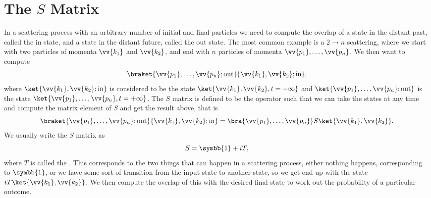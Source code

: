 \documentclass[fleqn]{NotesClass}
\newcommand{\ident}{\symbb{1}}
\begin{document}
    \section{The \texorpdfstring{\(S\)}{S} Matrix}
    In a scattering process with an arbitrary number of initial and final particles we need to compute the overlap of a state in the distant past, called the in state, and a state in the distant future, called the out state.
    The most common example is a \(2 \to n\) scattering, where we start with two particles of momenta \(\vv{k_1}\) and \(\vv{k_2}\), and end with \(n\) particles of momenta \(\vv{p_1}, \dotsc, \vv{p_n}\).
    We then want to compute
    \begin{equation}
        \braket{\vv{p_1}, \dotsc, \vv{p_n}; \text{out}}{\vv{k_1}, \vv{k_2}; \text{in}},
    \end{equation}
    where \(\ket{\vv{k_1}, \vv{k_2}; \text{in}}\) is considered to be the state \(\ket{\vv{k_1}, \vv{k_2}, t = -\infty}\) and \(\ket{\vv{p_1}, \dotsc, \vv{p_n}; \text{out}}\) is the state \(\ket{\vv{p_1}, \dotsc, \vv{p_n}, t = +\infty}\).
    The \(S\) matrix is defined to be the operator such that we can take the states at any time and compute the matrix element of \(S\) and get the result above, that is
    \begin{equation}
        \braket{\vv{p_1}, \dotsc, \vv{p_n}; \text{out}}{\vv{k_1}, \vv{k_2}; \text{in}} = \bra{\vv{p_1}, \dotsc, \vv{p_n}} S \ket{\vv{k_1}, \vv{k_2}}.
    \end{equation}
    We usually write the \(S\) matrix as
    \begin{equation}
        S = \ident + iT,
    \end{equation}
    where \(T\) is called the .
    This corresponds to the two things that can happen in a scattering process, either nothing happens, corresponding to \(\ident\), or we have some sort of transition from the input state to another state, so we get end up with the state \(iT\ket{\vv{k_1}, \vv{k_2}}\).
    We then compute the overlap of this with the desired final state to work out the probability of a particular outcome.
    
\end{document}
